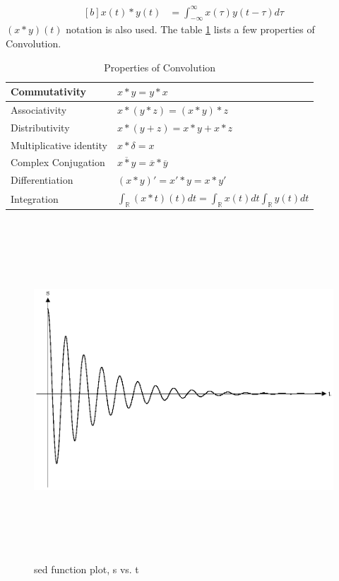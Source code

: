 \documentclass[letterpaper, 11pt]{article}
\newcommand{\fint}{\int_{-\infty}^{\infty}} %
\newcommand{\conv}[4]{\fint #3(#2)#4(#1 - #2) d#2} %
\numberwithin{equation}{section}
\numberwithin{figure}{section}
\numberwithin{table}{section}
\begin{document}
\begin{equation}
	\begin{aligned}[b]
		x(t)*y(t)
			&= \conv{t}{\tau}{x}{y}
			\label{eq:convolution}
	\end{aligned}
\end{equation}
\((x*y)(t)\) notation is also used. The table \ref{tab:convolution} lists a few properties of Convolution.
\begin{table}
	\centering
	\caption[optional argument]{Properties of Convolution}
	\begin{tabular}{|l|l|}
		\hline
		Commutativity	& \(x*y = y*x\) \\
		\hline
		Associativity	& \(x*(y*z) = (x*y)*z \) \\
		\hline
		Distributivity	& \(x*(y + z) = x*y + x*z \) \\
		\hline
		Multiplicative identity	& \(x*\delta = x \)\\
		\hline
		Complex Conjugation	& \(\overline{x*y} = \overline{x}*\overline{y}\) \\
		\hline
		Differentiation	& \((x*y)' = x'*y = x*y' \) \\
		\hline
		Integration	& \(\int_{\mathbb{R}}(x*t)(t) dt
					= \int_{\mathbb{R}} x(t) dt
					  \int_{\mathbb{R}} y(t) dt\) \\
		\hline
	\end{tabular}
	\label{tab:convolution}
\end{table}


\begin{figure}[H]
	\centering
	\includegraphics[height=5in]{sed.eps}
	\caption{sed function plot, s vs. t}
	\label{fig1}
\end{figure}
\end{document}
